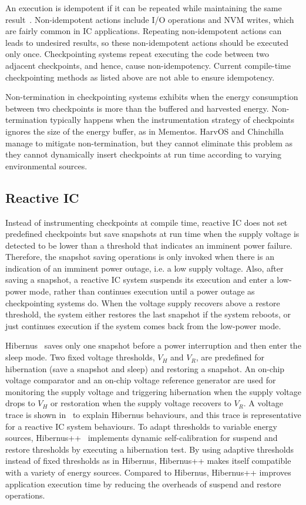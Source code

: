 An execution is idempotent if it can be repeated while maintaining the same result~\cite{lucia2015simpler}. Non-idempotent actions include I/O operations and NVM writes, which are fairly common in IC applications. Repeating non-idempotent actions can leads to undesired results, so these non-idempotent actions should be executed only once. Checkpointing systems repeat executing the code between two adjacent checkpoints, and hence, cause non-idempotency. Current compile-time checkpointing methods as listed above are not able to ensure idempotency. 

Non-termination in checkpointing systems exhibits when the energy consumption between two checkpoints is more than the buffered and harvested energy. Non-termination typically happens when the instrumentation strategy of checkpoints ignores the size of the energy buffer, as in Mementos. HarvOS and Chinchilla manage to mitigate non-termination, but they cannot eliminate this problem as they cannot dynamically insert checkpoints at run time according to varying environmental sources. 

\subsection{Reactive IC} \label{Section:reactiveic}

Instead of instrumenting checkpoints at compile time, reactive IC does not set predefined checkpoints but save snapshots at run time when the supply voltage is detected to be lower than a threshold that indicates an imminent power failure. Therefore, the snapshot saving operations is only invoked when there is an indication of an imminent power outage, i.e. a low supply voltage. Also, after saving a snapshot, a reactive IC system suspends its execution and enter a low-power mode, rather than continues execution until a power outage as checkpointing systems do. When the voltage supply recovers above a restore threshold, the system either restores the last snapshot if the system reboots, or just continues execution if the system comes back from the low-power mode.

Hibernus~\cite{balsamo2015hibernus} saves only one snapshot before a power interruption and then enter the sleep mode. Two fixed voltage thresholds, $V_H$ and $V_R$, are predefined for hibernation (save a snapshot and sleep) and restoring a snapshot. An on-chip voltage comparator and an on-chip voltage reference generator are used for monitoring the supply voltage and triggering hibernation when the supply voltage drops to $V_H$ or restoration when the supply voltage recovers to $V_R$. A voltage trace is shown in~ to explain Hibernus behaviours, and this trace is representative for a reactive IC system behaviours. To adapt thresholds to variable energy sources, Hibernus++~\cite{balsamo2016hibernus++} implements dynamic self-calibration for suspend and restore thresholds by executing a hibernation test. By using adaptive thresholds instead of fixed thresholds as in Hibernus, Hibernus++ makes itself compatible with a variety of energy sources. Compared to Hibernus, Hibernus++ improves application execution time by reducing the overheads of suspend and restore operations.

